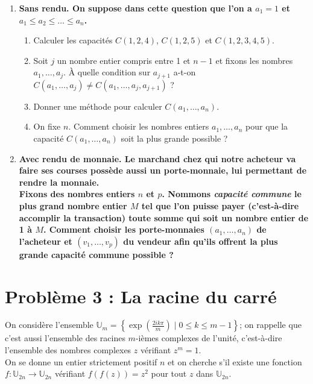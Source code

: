 \documentclass[landscape,twocolumn,leqno,a4paper,10pt]{report} %
\newcommand\n{\noindent}
\renewcommand{\leq}{\leqslant}
\renewcommand{\textbf}[1]{\begingroup\bfseries\mathversion{bold}#1\endgroup}		%
\begin{document}
\begin{enumerate}
	\item \textbf{Sans rendu.} On suppose dans cette question que l'on a $a_{1}=1$ et $a_{1} \leq a_{2} \leq \ldots \leq a_{n}$.
	\begin{enumerate}
		\item Calculer les capacités $C(1,2,4)$, $C(1,2,5)$ et $C(1,2,3,4,5)$.
		\item Soit $j$ un nombre entier compris entre 1 et $n-1$ et fixons les nombres $a_{1}, \ldots, a_{j}$. À quelle condition sur $a_{j+1}$ a-t-on $C\left(a_{1}, \ldots, a_{j}\right) \neq C\left(a_{1}, \ldots, a_{j}, a_{j+1}\right)$ ?
		\item Donner une méthode pour calculer $C\left(a_{1}, \ldots, a_{n}\right)$.
		\item On fixe $n$. Comment choisir les nombres entiers $a_{1}, \ldots, a_{n}$ pour que la capacité $C\left(a_{1}, \ldots, a_{n}\right)$ soit la plus grande possible ?
	\end{enumerate}
	\item \textbf{Avec rendu de monnaie.} Le marchand chez qui notre acheteur va faire ses courses possède aussi un porte-monnaie, lui permettant de rendre la monnaie.\\
	Fixons des nombres entiers $n$ et $p$. Nommons \textit{capacité commune} le plus grand nombre entier $M$ tel que l'on puisse payer (c'est-à-dire accomplir la transaction) toute somme qui soit un nombre entier de 1 à $M$. Comment choisir les porte-monnaies $\left(a_{1}, \ldots, a_{n}\right)$ de l'acheteur et $\left(v_{1}, \ldots, v_{p}\right)$ du vendeur afin qu'ils offrent la plus grande capacité commune possible ?
\end{enumerate}

\newpage

\section{Problème 3 : La racine du carré}

\n On considère l'ensemble $\mathbb{U}_{m}=\left\{\exp \left(\frac{2 i k \pi}{m}\right) \mid 0 \leq k \leq m-1\right\}$; on rappelle que c'est aussi l'ensemble des racines $m$-ièmes complexes de l'unité, c'est-à-dire l'ensemble des nombres complexes $z$ vérifiant $z^{m}=1$.\\

\n On se donne un entier strictement positif $n$ et on cherche s'il existe une fonction $f: \mathbb{U}_{2n} \longrightarrow \mathbb{U}_{2n}$ vérifiant $f(f(z))=z^{2}$ pour tout $z$ dans $\mathbb{U}_{2n}$.
\end{document}
